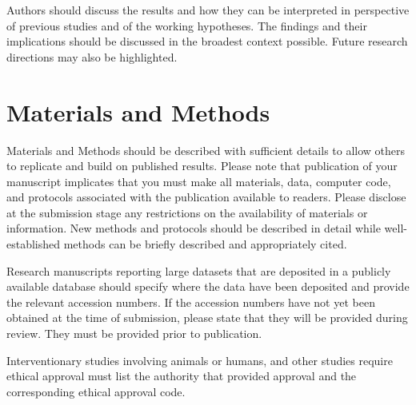 \documentclass[journal,article,submit,moreauthors,pdftex,10pt,a4paper]{mdpi}
\begin{document}
Authors should discuss the results and how they can be interpreted in perspective of previous studies and of the working hypotheses. The findings and their implications should be discussed in the broadest context possible. Future research directions may also be highlighted.

\section{Materials and Methods}

Materials and Methods should be described with sufficient details to allow others to replicate and build on published results. Please note that publication of your manuscript implicates that you must make all materials, data, computer code, and protocols associated with the publication available to readers. Please disclose at the submission stage any restrictions on the availability of materials or information. New methods and protocols should be described in detail while well-established methods can be briefly described and appropriately cited.

Research manuscripts reporting large datasets that are deposited in a publicly available database should specify where the data have been deposited and provide the relevant accession numbers. If the accession numbers have not yet been obtained at the time of submission, please state that they will be provided during review. They must be provided prior to publication.

Interventionary studies involving animals or humans, and other studies require ethical approval must list the authority that provided approval and the corresponding ethical approval code. 


\vspace{6pt} 



\end{document}
